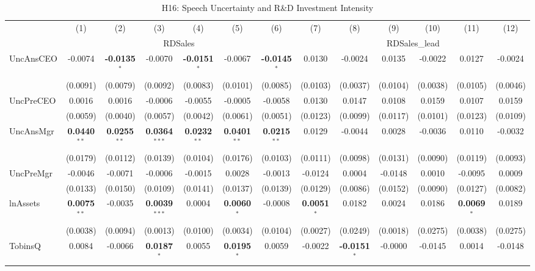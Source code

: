 \documentclass[11pt,a4paper]{article}
\begin{document}
\begin{table}[htbp]
\centering
\caption{H16: Speech Uncertainty and R\&D Investment Intensity}
\label{tab:h16}
\scriptsize
\begin{tabular}{lcccccccccccc}
\toprule
 & (1) & (2) & (3) & (4) & (5) & (6) & (7) & (8) & (9) & (10) & (11) & (12) \\
 & \multicolumn{6}{c}{RDSales} & \multicolumn{6}{c}{RDSales\_lead} \\
\cmidrule(lr){2-7} \cmidrule(lr){8-13}
\midrule
UncAnsCEO & -0.0074 & \textbf{-0.0135}$^{*}$ & -0.0070 & \textbf{-0.0151}$^{*}$ & -0.0067 & \textbf{-0.0145}$^{*}$ & 0.0130 & -0.0024 & 0.0135 & -0.0022 & 0.0127 & -0.0024 \\
 & (0.0091) & (0.0079) & (0.0092) & (0.0083) & (0.0101) & (0.0085) & (0.0103) & (0.0037) & (0.0104) & (0.0038) & (0.0105) & (0.0046) \\
UncPreCEO & 0.0016 & 0.0016 & -0.0006 & -0.0055 & -0.0005 & -0.0058 & 0.0130 & 0.0147 & 0.0108 & 0.0159 & 0.0107 & 0.0159 \\
 & (0.0059) & (0.0040) & (0.0057) & (0.0042) & (0.0061) & (0.0051) & (0.0123) & (0.0099) & (0.0117) & (0.0101) & (0.0123) & (0.0109) \\
UncAnsMgr & \textbf{0.0440}$^{**}$ & \textbf{0.0255}$^{**}$ & \textbf{0.0364}$^{***}$ & \textbf{0.0232}$^{**}$ & \textbf{0.0401}$^{**}$ & \textbf{0.0215}$^{**}$ & 0.0129 & -0.0044 & 0.0028 & -0.0036 & 0.0110 & -0.0032 \\
 & (0.0179) & (0.0112) & (0.0139) & (0.0104) & (0.0176) & (0.0103) & (0.0111) & (0.0098) & (0.0131) & (0.0090) & (0.0119) & (0.0093) \\
UncPreMgr & -0.0046 & -0.0071 & -0.0006 & -0.0015 & 0.0028 & -0.0013 & -0.0124 & 0.0004 & -0.0148 & 0.0010 & -0.0095 & 0.0009 \\
 & (0.0133) & (0.0150) & (0.0109) & (0.0141) & (0.0137) & (0.0139) & (0.0129) & (0.0086) & (0.0152) & (0.0090) & (0.0127) & (0.0082) \\
\midrule
lnAssets & \textbf{0.0075}$^{**}$ & -0.0035 & \textbf{0.0039}$^{***}$ & 0.0004 & \textbf{0.0060}$^{*}$ & -0.0008 & \textbf{0.0051}$^{*}$ & 0.0182 & 0.0024 & 0.0186 & \textbf{0.0069}$^{*}$ & 0.0189 \\
 & (0.0038) & (0.0094) & (0.0013) & (0.0100) & (0.0034) & (0.0104) & (0.0027) & (0.0249) & (0.0018) & (0.0275) & (0.0038) & (0.0275) \\
TobinsQ & 0.0084 & -0.0066 & \textbf{0.0187}$^{*}$ & 0.0055 & \textbf{0.0195}$^{*}$ & 0.0059 & -0.0022 & \textbf{-0.0151}$^{*}$ & -0.0000 & -0.0145 & 0.0014 & -0.0148 \\

\end{tabular}
\end{table}
\end{document}

